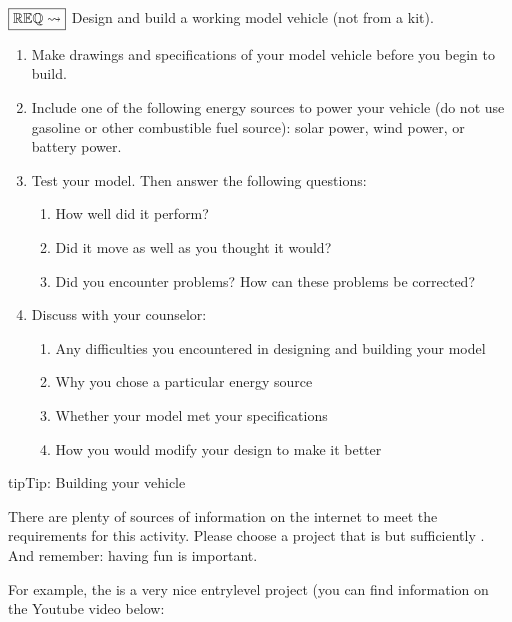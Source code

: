 \documentclass[letterpaper,10pt,english,openany,oneside]{sphinxmanual}
\begin{document}
\(\boxed{\mathbb{REQ}\Large \rightsquigarrow}\) Design and build a working model vehicle (not from a kit).
\begin{enumerate}
%
\item {} 
Make drawings and specifications of your model vehicle before you begin to build.

\item {} 
Include one of the following energy sources to power your vehicle  (do not use gasoline or other combustible fuel source): solar power, wind power, or battery power.

\item {} 
Test your model. Then answer the following questions:
\begin{enumerate}
%
\item {} 
How well did it perform?

\item {} 
Did it move as well as you thought it would?

\item {} 
Did you encounter problems? How can these problems be corrected?

\end{enumerate}

\item {} 
Discuss with your counselor:
\begin{enumerate}
%
\item {} 
Any difficulties you encountered in designing and building your model

\item {} 
Why you chose a particular energy source

\item {} 
Whether your model met your specifications

\item {} 
How you would modify your design to make it better

\end{enumerate}

\end{enumerate}

\begin{sphinxadmonition}{tip}{Tip:}
Building your vehicle

There are plenty of sources of information on the internet to meet the requirements for this activity. Please choose a project that is  but sufficiently . And remember: having fun is important.

For example, the  is a very nice entry\sphinxhyphen{}level project (you can find information on the Youtube video below:


\end{sphinxadmonition}
\end{document}
